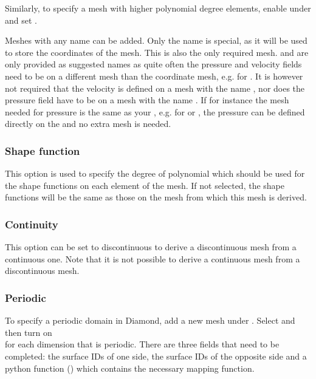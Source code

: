 Similarly, to specify a mesh with higher polynomial degree elements, enable
 under  and set
.

Meshes with any name can be added. Only the name  
is special, as it will be used to store the coordinates of the mesh. This 
is also the only required mesh.  and 
are only provided as suggested names as quite often the pressure 
and velocity fields need to be on a different mesh 
than the coordinate mesh, e.g. for \PoDGPt. It is however 
not required that the velocity is defined on a mesh with the name
, nor does the pressure field have to be on a mesh
with the name . If for instance the mesh needed 
for pressure is the same as your , e.g. 
for \Poo or \Pzero\Pone, the pressure can be defined directly on
the  and no extra mesh is needed.

\subsubsection{Shape function}

This option is used to specify the degree of polynomial which should be used
for the shape functions on each element of the mesh. If not selected, the
shape functions will be the same as those on the mesh from which this mesh
is derived.

\subsubsection{Continuity}

This option can be set to discontinuous to derive a discontinuous mesh from
a continuous one. Note that it is not possible to derive a continuous mesh
from a discontinuous mesh.

\subsubsection{Periodic}\label{sec:periodic}

To specify a periodic domain in Diamond, add a new mesh under
.  Select \onlypdf\linebreak
{} and then turn
on \onlypdf\\
 for each dimension
that is periodic. There are three fields that need to be completed: the
surface IDs of one side, the surface IDs of the opposite side and a python
function () which contains the necessary mapping
function.

